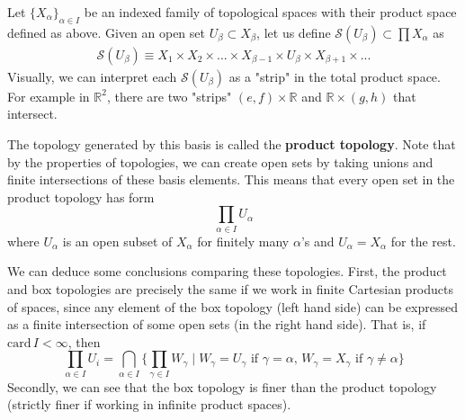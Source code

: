 \documentclass{article}
\begin{document}
    \begin{definition}
    Let $\{X_\alpha\}_{\alpha \in I}$ be an indexed family of topological spaces with their product space defined as above. Given an open set $U_\beta \subset X_\beta$, let us define $\mathscr{S} (U_\beta) \subset \prod X_\alpha$ as 
    \begin{align*}
        \mathscr{S}(U_\beta) \equiv X_1 \times X_2 \times ... \times X_{\beta -1} \times U_\beta \times X_{\beta+1} \times ... 
    \end{align*}
    Visually, we can interpret each $\mathscr{S} (U_\beta)$ as a "strip" in the total product space. For example in $\mathbb{R}^2$, there are two "strips" $(e, f) \times \mathbb{R}$ and $\mathbb{R} \times (g, h)$ that intersect. 
    \begin{center}
    \end{center}
    The topology generated by this basis is called the \textbf{product topology}. Note that by the properties of topologies, we can create open sets by taking unions and finite intersections of these basis elements. This means that every open set in the product topology has form
    \[\prod_{\alpha \in I} U_\alpha\]
    where $U_\alpha$ is an open subset of $X_\alpha$ for finitely many $\alpha$'s and $U_\alpha = X_\alpha$ for the rest. 
    \end{definition}

    We can deduce some conclusions comparing these topologies. First, the product and box topologies are precisely the same if we work in finite Cartesian products of spaces, since any element of the box topology (left hand side) can be expressed as a finite intersection of some open sets (in the right hand side). That is, if $\text{card}\,I < \infty$, then 
    \[\prod_{\alpha \in I} U_i = \bigcap_{\alpha \in I} \big\{ \prod_{\gamma \in I} W_\gamma \; | \; W_\gamma = U_\gamma \text{ if } \gamma = \alpha, \, W_\gamma = X_\gamma \text{ if } \gamma \neq \alpha\big\}\]
    Secondly, we can see that the box topology is finer than the product topology (strictly finer if working in infinite product spaces). 
\end{document}
